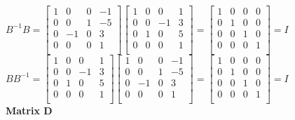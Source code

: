 \documentclass[12pt,letterpaper]{article}
\begin{document}
\begin{enumerate}[leftmargin=*]
$B^{-1} B = 
\begin{bmatrix}
1 & 0  & 0 & -1\\
0 & 0  & 1 & -5\\
0 & -1 & 0 &  3\\
0 & 0  & 0 &  1\\
\end{bmatrix}
\begin{bmatrix}
1 & 0  &  0 & 1\\
0 & 0  & -1 & 3\\
0 & 1 &  0 & 5\\
0 & 0  &  0 & 1\\
\end{bmatrix}
= \begin{bmatrix} 1 & 0 & 0 & 0\\ 0 & 1 & 0 & 0\\ 0 & 0 & 1 & 0\\ 0 & 0 & 0 & 1\\ \end{bmatrix} 
= I$\\

$B B^{-1} = 
\begin{bmatrix}
1 & 0  &  0 & 1\\
0 & 0  & -1 & 3\\
0 & 1 &  0 & 5\\
0 & 0  &  0 & 1\\
\end{bmatrix}
\begin{bmatrix}
1 & 0  & 0 & -1\\
0 & 0  & 1 & -5\\
0 & -1 & 0 &  3\\
0 & 0  & 0 &  1\\
\end{bmatrix}
= \begin{bmatrix} 1 & 0 & 0 & 0\\ 0 & 1 & 0 & 0\\ 0 & 0 & 1 & 0\\ 0 & 0 & 0 & 1\\ \end{bmatrix} 
= I$\\

\textbf{Matrix D}


\end{enumerate}
\end{document}
